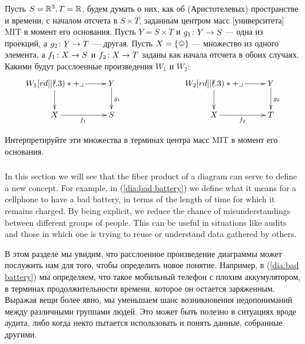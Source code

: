 \begin{exerciseRUS}
Пусть $S={\mathbb R}^3, T={\mathbb R}$, будем думать о них, как об (Аристотелевых) пространстве и времени, с началом отсчета в $S\times T$, заданным центром масс [университета] MIT в момент его основания. Пусть $Y=S\times T$ и $g_1\colon Y\rightarrow S$ — одна из проекций, а $g_2\colon Y\rightarrow T$ — другая. Пусть $X=\singleton$ — множество из одного элемента, а $f_1\colon X\rightarrow S$ и $f_2\colon X\rightarrow T$ заданы как начала отсчета в обоих случаях. 
\sexc Какими будут расслоенные произведения $W_1$ и $W_2$:
$$
\xymatrix{W_1\ar[r]\ar[d]\ullimit&Y\ar[d]^{g_1}\\X\ar[r]_{f_1}&S}\hspace{1in}
\xymatrix{W_2\ar[r]\ar[d]\ullimit&Y\ar[d]^{g_2}\\X\ar[r]_{f_2}&T}
$$
\item Интерпретируйте эти множества в терминах центра масс MIT в момент его основания.
\endsexc
\end{exerciseRUS}


\subsubsection{}

\begin{blockENG}
In this section we will see that the fiber product of a diagram can serve to define a new concept. For example, in (\ref{dia:bad battery}) we define what it means for a cellphone to have a bad battery, in terms of the length of time for which it remains charged. By being explicit, we reduce the chance of misunderstandings between different groups of people. This can be useful in situations like audits and those in which one is trying to reuse or understand data gathered by others.
\end{blockENG}

\begin{blockRUS}
В этом разделе мы увидим, что расслоенное произведение диаграммы может послужить нам для того, чтобы определить новое понятие. Например, в (\ref{dia:bad battery}) мы определяем, что такое мобильный телефон с плохим аккумулятором, в терминах продолжительности времени, которое он остается заряженным. Выражая вещи более явно, мы уменьшаем шанс возникновения недопониманий между различными группами людей. Это может быть полезно в ситуациях вроде аудита, либо когда некто пытается использовать и понять данные, собранные другими.
\end{blockRUS}

